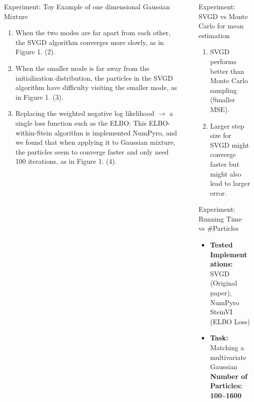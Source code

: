 \documentclass[final]{beamer}
\newlength{\sepwidth}
\newlength{\colwidth}
\newcommand{\separatorcolumn}{\begin{column}{\sepwidth}\end{column}}
\begin{document}
\begin{frame}[t]
\begin{columns}[t]
\begin{column}{\colwidth}
\begin{block}{Experiment: Toy Example of one dimensional Gaussian Mixture}
    \begin{enumerate}
        \item When the two modes are far apart from each other, the SVGD algorithm converges more slowly, as in Figure 1. (2).
        \item When the smaller mode is far away from the initialization distribution, the particles in the SVGD algorithm have difficulty visiting the smaller mode, as in Figure 1. (3).
        \item Replacing the weighted negative log likelihood $\rightarrow$ a single loss function such as the ELBO: This ELBO-within-Stein algorithm is implemented NumPyro, and we found that when applying it to Gaussian mixture, the particles seem to converge faster and only need 100 iterations, as in Figure 1. (4). 
    \end{enumerate}
  \end{block}
  


\end{column}

\separatorcolumn

\begin{column}{\colwidth}

    


\begin{block}{Experiment: SVGD vs Monte Carlo for mean estimation}
    \begin{enumerate}
    \item SVGD performs better than Monte Carlo sampling (Smaller MSE).
    \item Larger step size for SVGD might converge faster but might also lead to larger error.
    \end{enumerate}
    
\end{block}

  \begin{block}{Experiment: Running Time vs \#Particles}

    \begin{itemize}
     \item \textbf{Tested Implementations:} SVGD (Original paper), NumPyro SteinVI (ELBO Loss)
     \item \textbf{Task:} Matching a multivariate Gaussian \quad  \textbf{Number of Particles: 100\sim 1600}
    \end{itemize}
     
  \end{block}


\end{column}
\end{columns}
\end{frame}
\end{document}
